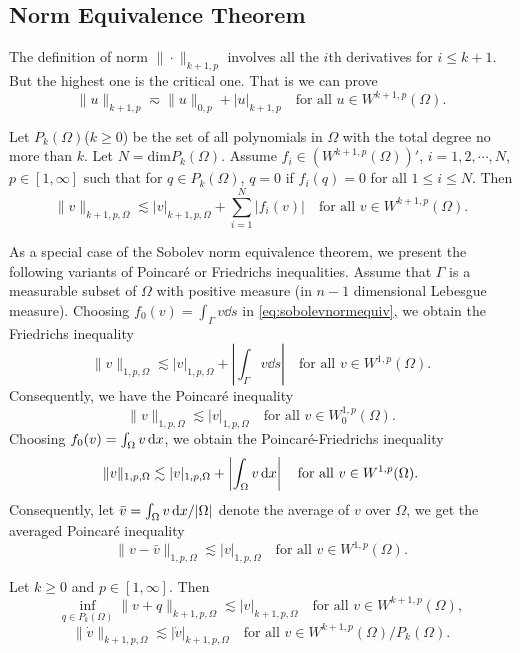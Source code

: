 \subsection{Norm Equivalence Theorem}
The definition of norm $\|\cdot\|_{k+1,p}$ involves all the $i$th
derivatives for $i\leq k + 1$. But the highest one is the critical one. That is we can prove \cite[Theorem 5.2 in page 135]{AdamsFournier2003}
\[
\|u\|_{k+1,p}\eqsim\|u\|_{0,p}+|u|_{k+1,p}\quad\textrm{for all } u\in W^{k+1, p}(\Omega).
\]

\begin{theorem}
Let $P_k(\Omega)$($k\geq0$) be the set of all polynomials in $\Omega$ with the total degree no more than $k$. Let $N=\mathrm{dim}P_k(\Omega)$. Assume $f_i\in(W^{k+1,p}(\Omega))'$, $i=1,2,\cdots,N$, $p\in[1,\infty]$ such that for $q\in P_k(\Omega)$, $q=0$ if $f_i(q)=0$ for all $1\leq i\leq N$. Then
\begin{equation}\label{eq:sobolevnormequiv}
\|v\|_{k+1,p,\Omega}\lesssim  |v|_{k+1,p,\Omega}+\sum_{i=1}^N|f_i(v)|\quad\textrm{for all } v\in W^{k+1,p}(\Omega).
\end{equation}
\end{theorem}

As a special case of the Sobolev norm equivalence theorem, we present the following
variants of Poincar\'e or Friedrichs inequalities. Assume that $\Gamma$ is a measurable subset of
$\Omega$ with positive measure (in $n-1$ dimensional Lebesgue measure). Choosing $f_0(v) =\int_{\Gamma}v\dd s$
 in \eqref{eq:sobolevnormequiv}, we obtain the Friedrichs inequality
\[
\|v\|_{1,p,\Omega}\lesssim  |v|_{1,p,\Omega}+\left|\int_{\Gamma}v\dd s\right|\quad\textrm{for all } v\in W^{1,p}(\Omega).
\]
Consequently, we have the Poincar\'e inequality
\begin{equation}\label{eq:poincareinequalityW1p}
\|v\|_{1,p,\Omega}\lesssim  |v|_{1,p,\Omega}\quad\textrm{for all } v\in W_0^{1,p}(\Omega).
\end{equation}
Choosing $f_0(v)=\int_{\Omega}v\,{\rm d}x$, we obtain the Poincar\'e-Friedrichs inequality
\[
\|v\|_{1,p,\Omega}\lesssim  |v|_{1,p,\Omega}+\left|\int_{\Omega}v\,{\rm d}x\right|\quad\textrm{for all } v\in W^{1,p}(\Omega).
\]
Consequently, let $\bar{v} =\int_{\Omega}v\,{\rm d}x/|\Omega|$ denote the average of $v$ over $\Omega$, we get the averaged
Poincar\'e inequality
\[
\|v-\bar{v}\|_{1,p,\Omega}\lesssim  |v|_{1,p,\Omega}\quad\textrm{for all } v\in W^{1,p}(\Omega).
\]

\begin{theorem}\label{thm:quotientspacenorms}
Let $k\geq0$ and $p\in[1, \infty]$. Then
\[
\inf_{q\in P_k(\Omega)}\|v+q\|_{k+1,p,\Omega}\lesssim  |v|_{k+1,p,\Omega}\quad\textrm{for all } v\in W^{k+1,p}(\Omega),
\]
\[
\|\dot{v}\|_{k+1,p,\Omega}\lesssim  |\dot{v}|_{k+1,p,\Omega}\quad\textrm{for all } v\in W^{k+1,p}(\Omega)/P_k(\Omega).
\]
\end{theorem}


